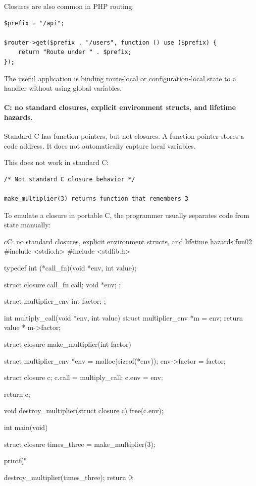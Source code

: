 Closures are also common in PHP routing:

\begin{verbatim}
$prefix = "/api";

$router->get($prefix . "/users", function () use ($prefix) {
    return "Route under " . $prefix;
});
\end{verbatim}

The useful application is binding route-local or configuration-local state to a handler without using global variables.

\paragraph{C: no standard closures, explicit environment structs, and lifetime hazards.}

Standard C has function pointers, but not closures. A function pointer stores a code address. It does not automatically capture local variables.

This does not work in standard C:

\begin{verbatim}
/* Not standard C closure behavior */

make_multiplier(3) returns function that remembers 3
\end{verbatim}

To emulate a closure in portable C, the programmer usually separates code from state manually:

\begin{codebox}[]{c}{C: no standard closures, explicit environment structs, and lifetime hazards.}{fun02}
#include <stdio.h>
#include <stdlib.h>

typedef int (*call_fn)(void *env, int value);

struct closure {
    call_fn call;
    void *env;
};

struct multiplier_env {
    int factor;
};

int multiply_call(void *env, int value) {
    struct multiplier_env *m = env;
    return value * m->factor;
}

struct closure make_multiplier(int factor) {
    struct multiplier_env *env = malloc(sizeof(*env));
    env->factor = factor;

    struct closure c;
    c.call = multiply_call;
    c.env = env;

    return c;
}

void destroy_multiplier(struct closure c) {
    free(c.env);
}

int main(void) {
    struct closure times_three = make_multiplier(3);

    printf("%

    destroy_multiplier(times_three);
    return 0;
}
\end{codebox}


